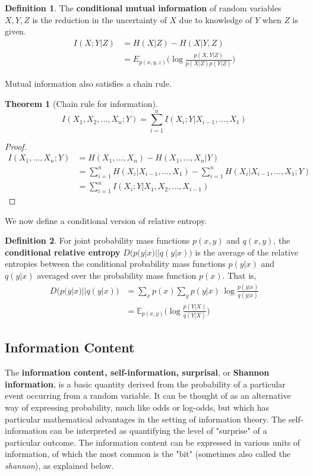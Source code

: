 \documentclass[a4paper, 12pt]{report}
\newtheorem{theorem}{Theorem}[section]
\theoremstyle{remark}
\theoremstyle{definition}
\newtheorem{definition}{Definition}[section]
\begin{document}
\begin{definition}
The \textbf{conditional mutual information} of random variables $X, Y, Z$ is the reduction in the uncertainty of $X$ due to knowledge of $Y$ when $Z$ is given. 
\begin{align*}
    I(X;Y|Z) & = H(X|Z) - H(X|Y, Z) \\
    & = E_{p(x, y, z)} \bigg( \log \frac{p(X, Y|Z)}{p(X|Z) p(Y|Z)}\bigg)
\end{align*}
\end{definition}

Mutual information also satisfies a chain rule. 

\begin{theorem}[Chain rule for information]
\[I(X_1, X_2, ..., X_n; Y) = \sum_{i=1}^n I(X_i;Y|X_{i-1}, ..., X_1)\]
\end{theorem}
\begin{proof}
\begin{align*}
    I(X_1, ..., X_n;Y) & = H(X_1, ..., X_n) - H(X_1, ..., X_n |Y) \\
    & = \sum_{i=1}^n H(X_i|X_{i-1}, ..., X_1) - \sum_{i=1}^n H(X_i | X_{i-1}, ..., X_1;Y) \\
    & = \sum_{i=1}^n I(X_i ; Y|X_1, X_2, ..., X_{i-1})
\end{align*}
\end{proof}

We now define a conditional version of relative entropy.

\begin{definition}
For joint probability mass functions $p(x, y)$ and $q(x, y)$, the \textbf{conditional relative entropy} $D\big( p(y|x) || q(y|x)\big)$ is the average of the relative entropies between the conditional probability mass functions $p(y|x)$ and $q(y|x)$ averaged over the probability mass function $p(x)$. That is, 
\begin{align*}
    D\big(p(y|x)||q(y|x)\big) & = \sum_x p(x) \sum_y p(y|x) \, \log \frac{p(y|x)}{q(y|x)} \\
    & = \mathbb{E}_{p(x, y)} \bigg( \log \frac{p(Y|X)}{q(Y|X)} \bigg) 
\end{align*}
\end{definition}

\subsection{Information Content}
The \textbf{information content, self-information, surprisal}, or \textbf{Shannon information}, is a basic quantity derived from the probability of a particular event occurring from a random variable. It can be thought of as an alternative way of expressing probability, much like odds or log-odds, but which has particular mathematical advantages in the setting of information theory. The self-information can be interpreted as quantifying the level of "surprise" of a particular outcome. The information content can be expressed in various units of information, of which the most common is the "bit" (sometimes also called the \textit{shannon}), as explained below. 
\end{document}
